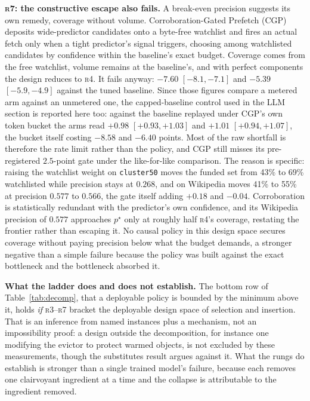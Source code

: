 \documentclass[letterpaper]{article} %
\newcommand{\rung}[1]{\textsc{#1}}
\begin{document}
\textbf{\rung{r7}: the constructive escape also fails.} A break-even precision suggests its own remedy, coverage without volume. Corroboration-Gated Prefetch (CGP) deposits wide-predictor candidates onto a byte-free watchlist and fires an actual fetch only when a tight predictor's signal triggers, choosing among watchlisted candidates by confidence within the baseline's exact budget. Coverage comes from the free watchlist, volume remains at the baseline's, and with perfect components the design reduces to \rung{r4}. It fails anyway: $-7.60$ $[-8.1,-7.1]$ and $-5.39$ $[-5.9,-4.9]$ against the tuned baseline. Since those figures compare a metered arm against an unmetered one, the capped-baseline control used in the LLM section is reported here too: against the baseline replayed under CGP's own token bucket the arms read $+0.98$ $[+0.93,+1.03]$ and $+1.01$ $[+0.94,+1.07]$, the bucket itself costing $-8.58$ and $-6.40$ points. Most of the raw shortfall is therefore the rate limit rather than the policy, and CGP still misses its pre-registered $2.5$-point gate under the like-for-like comparison. The reason is specific: raising the watchlist weight on \texttt{cluster50} moves the funded set from 43\% to 69\% watchlisted while precision stays at $0.268$, and on Wikipedia moves 41\% to 55\% at precision $0.577$ to $0.566$, the gate itself adding $+0.18$ and $-0.04$. Corroboration is statistically redundant with the predictor's own confidence, and its Wikipedia precision of $0.577$ approaches $p^{\star}$ only at roughly half \rung{r4}'s coverage, restating the frontier rather than escaping it. No causal policy in this design space secures coverage without paying precision below what the budget demands, a stronger negative than a simple failure because the policy was built against the exact bottleneck and the bottleneck absorbed it.

\textbf{What the ladder does and does not establish.} The bottom row of Table~\ref{tab:decomp}, that a deployable policy is bounded by the minimum above it, holds \emph{if} \rung{r3}--\rung{r7} bracket the deployable design space of selection and insertion. That is an inference from named instances plus a mechanism, not an impossibility proof: a design outside the decomposition, for instance one modifying the evictor to protect warmed objects, is not excluded by these measurements, though the substitutes result argues against it. What the rungs do establish is stronger than a single trained model's failure, because each removes one clairvoyant ingredient at a time and the collapse is attributable to the ingredient removed.
\end{document}
